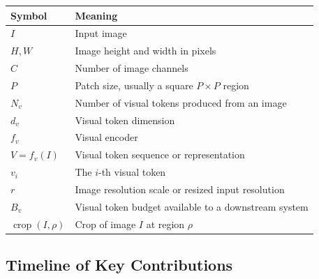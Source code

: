 \begin{center}
\begin{tabularx}{\textwidth}{@{}lX@{}}
\toprule
Symbol & Meaning \\
\midrule
$I$ & Input image \\
$H, W$ & Image height and width in pixels \\
$C$ & Number of image channels \\
$P$ & Patch size, usually a square $P \times P$ region \\
$N_v$ & Number of visual tokens produced from an image \\
$d_v$ & Visual token dimension \\
$f_v$ & Visual encoder \\
$V = f_v(I)$ & Visual token sequence or representation \\
$v_i$ & The $i$-th visual token \\
$r$ & Image resolution scale or resized input resolution \\
$B_v$ & Visual token budget available to a downstream system \\
$\operatorname{crop}(I,\rho)$ & Crop of image $I$ at region $\rho$ \\
\bottomrule
\end{tabularx}
\end{center}

\subsection*{Timeline of Key Contributions}

